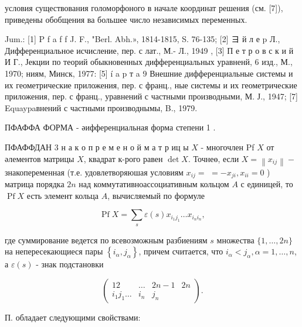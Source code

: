 \documentclass[10pt]{article}
\begin{document}
условия существования голоморфоного в начале координат решения (см. [7]), приведены обобщения ва большее число независимых переменных.



Jum.: [1] P f a f f J. F., "Berl. Abh.», 1814-1815, S. 76-135; [2] $ヨ$ й л е p Л., Дифференциальное исчисление, пер. с лат., М.- Л., 1949 , [3] П е т р о в с к и й И Г., Јекции по теорий обыкновенных дифференциальных уравненй, 6 изд., М., 1970; ниям, Минск, 1977: [5] í a p т a 9 Внешние дифференциальные системы и их геометрические приложения, пер. с франц., ные системы и их геометрические приложения, пер. с франц., уравнений с частными производными, М. Ј., 1947; [7] Equaypaвнений с частными производнымы, B., 1979.



ПФАФФА ФОРМА - әифференциальная форма степени 1 .



ПФАФФДАН 3 н а к о п р е м е н о й м а т р иц ы $X$ - многочлен Pf $X$ от әлементов матрицы $X$, квадрат к-рого равен $\operatorname{det} X$. Точнеө, если $X=\left\|x_{i j}\right\|-$ знакопеременная (т.е. удовлетворяюшая условиям $x_{i j}=$ $=-x_{j i}, x_{i i}=0$ ) матрица порядка $2 n$ над коммутативноассоциативным кольцом $A$ с единицей, то $\operatorname{Pf} X$ есть элемент кольца $A$, вычисляемый по формуле



\[

\operatorname{Pf} X=\sum_{s} \varepsilon(s) x_{i_{1} j_{1}} \ldots x_{i_{n} i_{n}},

\]



где суммирование ведется по всевозможным разбиениям $s$ множества $\{1, \ldots, 2 n\}$ на непересекающиеся пары $\left\{i_{\alpha}, j_{\alpha}\right\}$, причем считается, что $i_{\alpha}<j_{\alpha}, \alpha=1, \ldots, n$, а $\varepsilon(s)$ - знак подстановки



\[

\left(\begin{array}{llll}

12 & \ldots & 2 n-1 & 2 n \\

i_{1} j_{1} \ldots & i_{n} & j_{n}

\end{array}\right) .

\]



П. обладает следующими свойствами:
\end{document}
